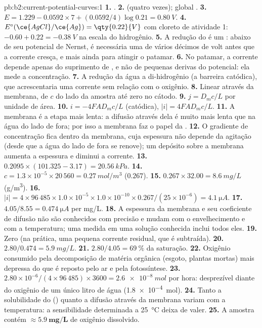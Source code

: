 \begin{solution}{pb:b2:current-potential-curves:1}
\textbf{1.} .
\textbf{2.}  (quatro vezes); global .
\textbf{3.} $E = 1.229 - 0.0592 \times 7 + (0.0592/4)\log 0.21 = \qty{0.80}{V}$.
\textbf{4.} $E^\circ(\ce{AgCl}/\ce{Ag}) = \qty{0.22}{V}$ com cloreto de atividade 1:
$-0.60 + 0.22 = \qty{-0.38}{V}$ na escala do hidrogênio.
\textbf{5.} A redução do  é um : abaixo de seu potencial de
Nernst, é necessária uma  de vários décimos de volt antes que a
corrente cresça, e mais ainda para atingir o patamar.
\textbf{6.} No patamar, a corrente depende apenas do suprimento de ,
e não de pequenas derivas do potencial: ela mede a concentração.
\textbf{7.} A redução da água a di-hidrogênio (a barreira catódica), que
acrescentaria uma corrente sem relação com o oxigênio.
\textbf{8.} Linear através da membrana, de $c$ do lado da amostra até zero no
cátodo.
\textbf{9.} $j = D_m c/L$ por unidade de área.
\textbf{10.} $i = -4FAD_m c/L$ (catódica), $|i| = 4FAD_mc/L$.
\textbf{11.} A membrana é a etapa mais lenta: a difusão através dela é muito
mais lenta que na água do lado de fora; por isso a membrana faz o papel da
.
\textbf{12.} O gradiente de concentração fica dentro da membrana, cuja
espessura não depende da agitação (desde que a água do lado de fora se
renove); um depósito sobre a membrana aumenta a espessura e diminui a corrente.
\textbf{13.} $0.2095 \times (101.325 - 3.17) = \qty{20.56}{kPa}$.
\textbf{14.} $c = 1.3 \times 10^{-5} \times 20\,560 = \qty{0.27}{mol/m^3}$ ($0.267$).
\textbf{15.} $0.267 \times 32.00 = \qty{8.6}{mg/L}$ (\unit{g/m^3}).
\textbf{16.} $|i| = 4 \times 96\,485 \times 1.0 \times 10^{-5} \times 1.0 \times 10^{-10}
\times 0.267/(25 \times 10^{-6}) = \qty{4.1}{\micro A}$.
\textbf{17.} $4.05/8.55 = \qty{0.474}{\micro A}$ per \unit{mg/L}.
\textbf{18.} A espessura da membrana e seu coeficiente de difusão não são
conhecidos com precisão e mudam com o envelhecimento e com a temperatura; uma
medida em uma solução conhecida inclui todos eles.
\textbf{19.} Zero (na prática, uma pequena corrente residual, que é subtraída).
\textbf{20.} $2.80/0.474 = \qty{5.9}{mg/L}$.
\textbf{21.} $2.80/4.05 = 69~\%$ da saturação.
\textbf{22.} Oxigênio consumido pela decomposição de matéria orgânica (esgoto,
plantas mortas) mais depressa do que é reposto pelo ar e pela fotossíntese.
\textbf{23.} $2.80 \times 10^{-6}/(4 \times 96\,485) \times 3600 = \qty{2.6e-8}{mol}$
por hora: desprezível diante do oxigênio de um único litro de água
(\qty{1.8e-4}{mol}).
\textbf{24.} Tanto a solubilidade do  () quanto a
difusão através da membrana variam com a temperatura: a sensibilidade
determinada a \qty{25}{\degreeCelsius} deixa de valer.
\textbf{25.} A amostra contém $\boldsymbol{\approx \qty{5.9}{mg/L}}$ de oxigênio
dissolvido.
\end{solution}
